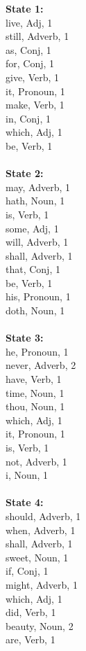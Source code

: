 \begin{multicols}{4}
\textbf{State 1:}\\
live, Adj, 1\\
still, Adverb, 1\\
as, Conj, 1\\
for, Conj, 1\\
give, Verb, 1\\
it, Pronoun, 1\\
make, Verb, 1\\
in, Conj, 1\\
which, Adj, 1\\
be, Verb, 1\\
\\
\textbf{State 2:}\\
may, Adverb, 1\\
hath, Noun, 1\\
is, Verb, 1\\
some, Adj, 1\\
will, Adverb, 1\\
shall, Adverb, 1\\
that, Conj, 1\\
be, Verb, 1\\
his, Pronoun, 1\\
doth, Noun, 1\\
\\
\textbf{State 3:} \\
he, Pronoun, 1\\
never, Adverb, 2\\
have, Verb, 1\\
time, Noun, 1\\
thou, Noun, 1\\
which, Adj, 1\\
it, Pronoun, 1\\
is, Verb, 1\\
not, Adverb, 1\\
i, Noun, 1\\
\\
\textbf{State 4:} \\
should, Adverb, 1\\
when, Adverb, 1\\
shall, Adverb, 1\\
sweet, Noun, 1\\
if, Conj, 1\\
might, Adverb, 1\\
which, Adj, 1\\
did, Verb, 1\\
beauty, Noun, 2\\
are, Verb, 1\\

\end{multicols}
